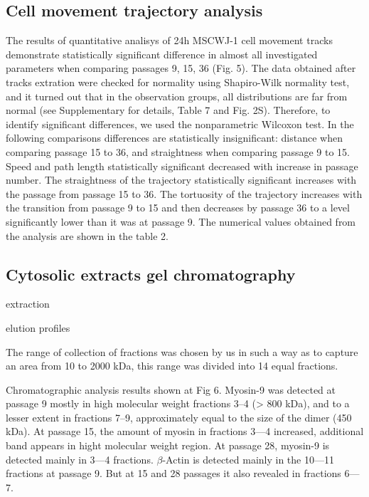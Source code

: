 \documentclass[alpha-refs]{wiley-article}
\begin{document}
\subsection{Cell movement trajectory analysis}

The results of quantitative analisys of 24h MSCWJ-1 cell movement tracks demonstrate statistically significant difference in almost all investigated parameters when comparing passages 9, 15, 36 (Fig. 5).
The data obtained after tracks extration were checked for normality using Shapiro-Wilk normality test, and it turned out that in the observation groups, all distributions are far from normal (see Supplementary for details, Table 7 and Fig. 2S).
Therefore, to identify significant differences, we used the nonparametric Wilcoxon test.
In the following comparisons differences are statistically insignificant: distance when comparing passage 15 to 36, and straightness when comparing passage 9 to 15.
Speed and path length statistically significant decreased with increase in passage number.
The straightness of the trajectory statistically significant increases with the passage from passage 15 to 36.
The tortuosity of the trajectory increases with the transition from passage 9 to 15 and then decreases by passage 36 to a level significantly lower than it was at passage 9.
The numerical values obtained from the analysis are shown in the table 2.

\subsection{Cytosolic extracts gel chromatography}

extraction

elution profiles

The range of collection of fractions was chosen by us in such a way as to capture an area from 10 to 2000 kDa, this range was divided into 14 equal fractions.

Chromatographic analysis results shown at Fig 6.
Myosin-9 was detected at passage 9 mostly in high molecular weight fractions 3--4 (> 800 kDa), and to a lesser extent in fractions 7--9, approximately equal to the size of the dimer (450 kDa).
At passage 15, the amount of myosin in fractions 3–--4 increased, additional band appears in hight molecular weight region.
At passage 28, myosin-9 is detected mainly in 3---4 fractions.
$\beta$-Actin is detected mainly in the 10---11 fractions at passage 9.
But at 15 and 28 passages it also revealed in fractions 6---7.
\end{document}
